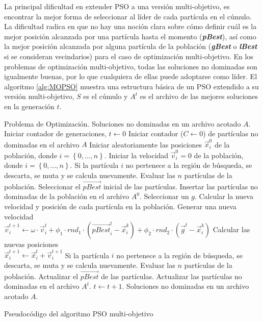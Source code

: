   La principal dificultad en extender PSO a una versi\'on multi-objetivo, es encontrar la mejor forma de seleccionar 
  al l\'ider de cada part\'icula en el c\'umulo. La dificultad radica en que no hay una noci\'on clara sobre c\'omo definir
  cu\'al es la mejor posici\'on alcanzada por una part\'icula hasta el momento (\textbf{\textit{pBest}}), as\'i como la mejor 
  posici\'on alcanzada por alguna part\'icula de la poblaci\'on (\textbf{\textit{gBest}} o \textbf{\textit{lBest}} si se consideran 
  vecindarios) para el caso de optimizaci\'on multi-objetivo. En los problemas de optimizaci\'on multi-objetivo, todas las soluciones 
  no dominadas son igualmente buenas, por lo que cualquiera de ellas puede adoptarse como l\'ider.  El algoritmo \ref{alg:MOPSO} 
  muestra una estructura b\'asica de un PSO extendido a su versi\'on multi-objetivo, $S$ es el c\'umulo y $A^t$ es el archivo de las 
  mejores soluciones en la generaci\'on $t$.

  \begin{algorithm}
  \begin{algorithmic}[1]
	\REQUIRE Problema de Optimizaci\'on.
	\ENSURE Soluciones no dominadas en un archivo acotado $A$.
		\STATE Iniciar contador de generaciones, $t \leftarrow 0$
		\STATE Iniciar contador ($C\leftarrow 0$) de part\'iculas no dominadas en el archivo $A$
		\STATE Iniciar aleatoriamente las posiciones $\vec{x}^{0}_{i}$ de la poblaci\'on, donde $i=\left\{0,\ldots,n\right\}$.		
		\STATE Iniciar la velocidad $\vec{v}^{0}_{i} = 0$ de la poblaci\'on, donde $i=\left\{0,\ldots,n\right\}$.
		\STATE Si la part\'icula $i$ no pertenece a la regi\'on de b\'usqueda, se descarta, se muta y se calcula nuevamente.	 
		\STATE Evaluar las $n$ part\'iculas de la poblaci\'on.
		\STATE Seleccionar el $\vec{pBest}$ inicial de las part\'iculas.  
		\STATE Insertar las part\'iculas no dominadas de la poblaci\'on en el archivo $A^{0}$.
			\STATE Seleccionar un $g$.
			\STATE Calcular la nueva velocidad y posici\'on de cada part\'icula en la poblaci\'on.
			    \STATE Generar una nueva velocidad 
			      \\ $\vec{v}^{t+1}_{i}\leftarrow\omega\cdot \vec{v}^{t}_{i}+\phi_{1}\cdot rnd_{1} \cdot \left(\vec{pBest}^{t}_{i}-
			      \vec{x}^{k}_{i}\right) 
			      +\phi_{2}\cdot rnd_{2} \cdot \left(\vec{g}^{t}-\vec{x}^{k}_{i}\right)$
			    \STATE Calcular las nuevas posiciones 
				\\$\vec{x}^{t+1}_{i}\leftarrow \vec{x}^{t}_{i}+\vec{v}^{t+1}_{i}$
			    \ENDFOR
			\STATE Si la part\'icula $i$ no pertenece a la regi\'on de b\'usqueda, se descarta, se muta y se calcula nuevamente.
			\STATE Evaluar las $n$ part\'iculas de la poblaci\'on.	
			\STATE Actualizar el $\vec{pBest}$ de las part\'iculas.  
			\STATE Actualizar las part\'iculas no dominadas en el archivo $A^{t}$.
			\STATE $t\leftarrow t+1$.
	\ENDWHILE
	\RETURN Soluciones no dominadas en un archivo acotado $A$.
	\end{algorithmic}
	\caption{Pseudoc\'odigo del algoritmo PSO multi-objetivo}
	\label{alg:MOPSO}
	\end{algorithm}

